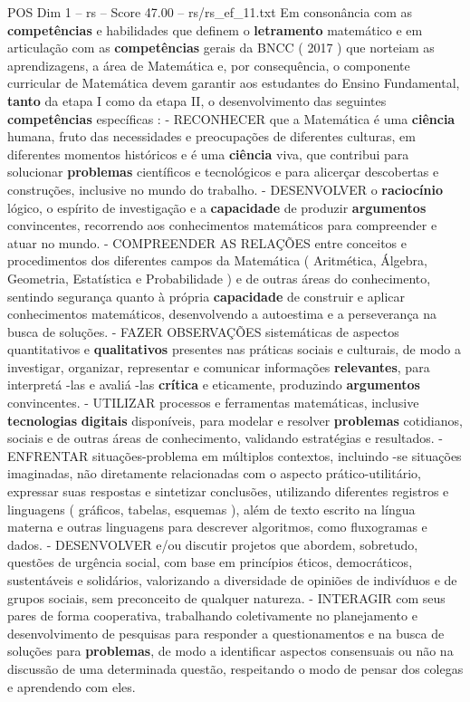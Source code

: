 \begin{textsample}{POS Dim 1 – rs – Score 47.00 – rs/rs\_ef\_11.txt}
Em consonância com as \textbf{competências} e habilidades que definem o \textbf{letramento} matemático e em articulação com as \textbf{competências} gerais da BNCC ( 2017 ) que norteiam as aprendizagens, a área de Matemática e, por consequência, o componente curricular de Matemática devem garantir aos estudantes do Ensino Fundamental, \textbf{tanto} da etapa I como da etapa II, o desenvolvimento das seguintes \textbf{competências} específicas : - RECONHECER que a Matemática é uma \textbf{ciência} humana, fruto das necessidades e preocupações de diferentes culturas, em diferentes momentos históricos e é uma \textbf{ciência} viva, que contribui para solucionar \textbf{problemas} científicos e tecnológicos e para alicerçar descobertas e construções, inclusive no mundo do trabalho. - DESENVOLVER o \textbf{raciocínio} lógico, o espírito de investigação e a \textbf{capacidade} de produzir \textbf{argumentos} convincentes, recorrendo aos conhecimentos matemáticos para compreender e atuar no mundo. - COMPREENDER AS RELAÇÕES entre conceitos e procedimentos dos diferentes campos da Matemática ( Aritmética, Álgebra, Geometria, Estatística e Probabilidade ) e de outras áreas do conhecimento, sentindo segurança quanto à própria \textbf{capacidade} de construir e aplicar conhecimentos matemáticos, desenvolvendo a autoestima e a perseverança na busca de soluções. - FAZER OBSERVAÇÕES sistemáticas de aspectos quantitativos e \textbf{qualitativos} presentes nas práticas sociais e culturais, de modo a investigar, organizar, representar e comunicar informações \textbf{relevantes}, para interpretá -las e avaliá -las \textbf{crítica} e eticamente, produzindo \textbf{argumentos} convincentes. - UTILIZAR processos e ferramentas matemáticas, inclusive \textbf{tecnologias} \textbf{digitais} disponíveis, para modelar e resolver \textbf{problemas} cotidianos, sociais e de outras áreas de conhecimento, validando estratégias e resultados. - ENFRENTAR situações-problema em múltiplos contextos, incluindo -se situações imaginadas, não diretamente relacionadas com o aspecto prático-utilitário, expressar suas respostas e sintetizar conclusões, utilizando diferentes registros e linguagens ( gráficos, tabelas, esquemas ), além de texto escrito na língua materna e outras linguagens para descrever algoritmos, como fluxogramas e dados. - DESENVOLVER e/ou discutir projetos que abordem, sobretudo, questões de urgência social, com base em princípios éticos, democráticos, sustentáveis e solidários, valorizando a diversidade de opiniões de indivíduos e de grupos sociais, sem preconceito de qualquer natureza. - INTERAGIR com seus pares de forma cooperativa, trabalhando coletivamente no planejamento e desenvolvimento de pesquisas para responder a questionamentos e na busca de soluções para \textbf{problemas}, de modo a identificar aspectos consensuais ou não na discussão de uma determinada questão, respeitando o modo de pensar dos colegas e aprendendo com eles.

\end{textsample}
